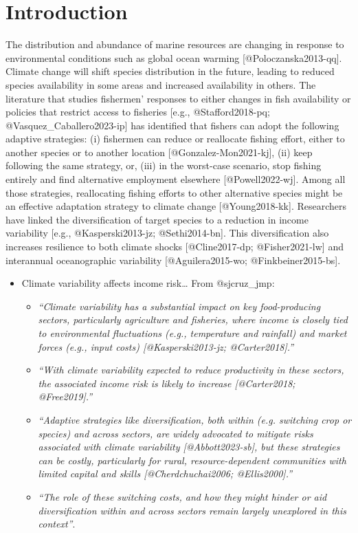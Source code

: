 \hypertarget{introduction}{%
\section{Introduction}\label{introduction}}

The distribution and abundance of marine resources are changing in
response to environmental conditions such as global ocean warming
{[}@Poloczanska2013-qq{]}. Climate change will shift species
distribution in the future, leading to reduced species availability in
some areas and increased availability in others. The literature that
studies fishermen' responses to either changes in fish availability or
policies that restrict access to fisheries {[}e.g., @Stafford2018-pq;
@Vasquez\_Caballero2023-ip{]} has identified that fishers can adopt the
following adaptive strategies: (i) fishermen can reduce or reallocate
fishing effort, either to another species or to another location
{[}@Gonzalez-Mon2021-kj{]}, (ii) keep following the same strategy, or,
(iii) in the worst-case scenario, stop fishing entirely and find
alternative employment elsewhere {[}@Powell2022-wj{]}. Among all those
strategies, reallocating fishing efforts to other alternative species
might be an effective adaptation strategy to climate change
{[}@Young2018-kk{]}. Researchers have linked the diversification of
target species to a reduction in income variability {[}e.g.,
@Kasperski2013-jz; @Sethi2014-bn{]}. This diversification also increases
resilience to both climate shocks {[}@Cline2017-dp; @Fisher2021-lw{]}
and interannual oceanographic variability {[}@Aguilera2015-wo;
@Finkbeiner2015-bs{]}.

\begin{itemize}
\tightlist
\item
  Climate variability affects income risk\ldots{} From @sjcruz\_jmp:

  \begin{itemize}
  \tightlist
  \item
    \emph{``Climate variability has a substantial impact on key
    food-producing sectors, particularly agriculture and fisheries,
    where income is closely tied to environmental fluctuations (e.g.,
    temperature and rainfall) and market forces (e.g., input costs)
    {[}@Kasperski2013-jz; @Carter2018{]}.''}
  \item
    \emph{``With climate variability expected to reduce productivity in
    these sectors, the associated income risk is likely to increase
    {[}@Carter2018; @Free2019{]}.''}
  \item
    \emph{``Adaptive strategies like diversification, both within (e.g.
    switching crop or species) and across sectors, are widely advocated
    to mitigate risks associated with climate variability
    {[}@Abbott2023-sb{]}, but these strategies can be costly,
    particularly for rural, resource-dependent communities with limited
    capital and skills {[}@Cherdchuchai2006; @Ellis2000{]}.''}
  \item
    \emph{``The role of these switching costs, and how they might hinder
    or aid diversification within and across sectors remain largely
    unexplored in this context''}.
  \end{itemize}
\end{itemize}

